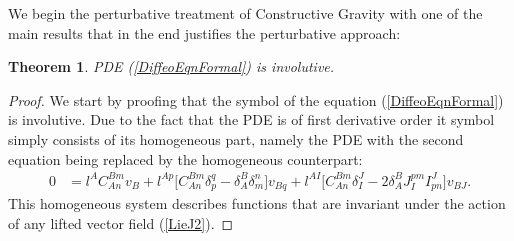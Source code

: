 \documentclass[a4paper,12pt, DIV=14, BCOR=5mm, twoside, headsepline, numbers=noenddot]{scrbook}
\newtheorem{theorem}{Theorem}[section]
\begin{document}
We begin the perturbative treatment of Constructive Gravity with one of the main results that in the end justifies the perturbative approach:
\begin{theorem}
PDE (\ref{DiffeoEqnFormal}) is involutive.
\end{theorem}
\begin{proof}
We start by proofing that the symbol of the equation (\ref{DiffeoEqnFormal}) is involutive. Due to the fact that the PDE is of first derivative order it symbol simply consists of its homogeneous part, namely the PDE with the second equation being replaced by the homogeneous counterpart:
\begin{align}
    0 &= l^{A} C_{An}^{Bm} v_B + l^{Ap} \bigl[ C_{An}^{Bm} \delta_p^q - \delta_A^B \delta_m^n \bigr] v_{Bq} + l^{AI} \bigl[ C_{An}^{Bm} \delta_I^J - 2 \delta_A^B J_I^{pm} I^J_{pn}  \bigr] v_{BJ}.
\end{align}
This homogeneous system describes functions that are invariant under the action of any lifted vector field (\ref{LieJ2}). 


\end{proof}
\end{document}
